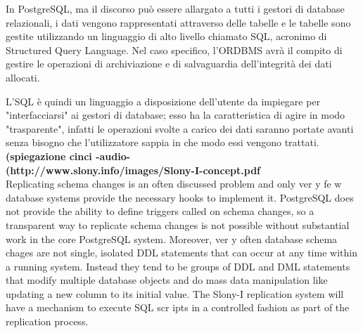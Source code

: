 In PostgreSQL, ma il discorso può essere allargato a tutti i gestori di database relazionali, i dati vengono rappresentati attraverso delle tabelle e le tabelle sono gestite utilizzando un linguaggio di alto livello chiamato SQL, acronimo di Structured Query Language.
Nel caso specifico, l'ORDBMS avrà il compito di gestire le operazioni di archiviazione e di salvaguardia dell'integrità dei dati allocati.

L'SQL è quindi un linguaggio a disposizione dell'utente da impiegare per "interfacciarsi" ai gestori di database; esso ha la caratteristica di agire in modo "trasparente", infatti le operazioni svolte a carico dei dati saranno portate avanti senza bisogno che l'utilizzatore sappia in che modo essi vengono trattati.\\
\textbf{(spiegazione cinci -audio-}\\
\textbf{(http://www.slony.info/images/Slony-I-concept.pdf}\\
Replicating schema changes is an often discussed problem and only ver y
fe w database systems provide the necessary hooks to implement it. PostgreSQL
does not provide the ability to define triggers called on schema changes, so a
transparent way to replicate schema changes is not possible without substantial
work in the core PostgreSQL system.
Moreover, ver y often database schema chages are not single, isolated DDL
statements that can occur at any time within a running system. Instead they tend
to be groups of DDL and DML statements that modify multiple database objects
and do mass data manipulation like updating a new column to its initial value.
The Slony-I replication system will have a mechanism to execute SQL
scr ipts in a controlled fashion as part of the replication process.

\item

